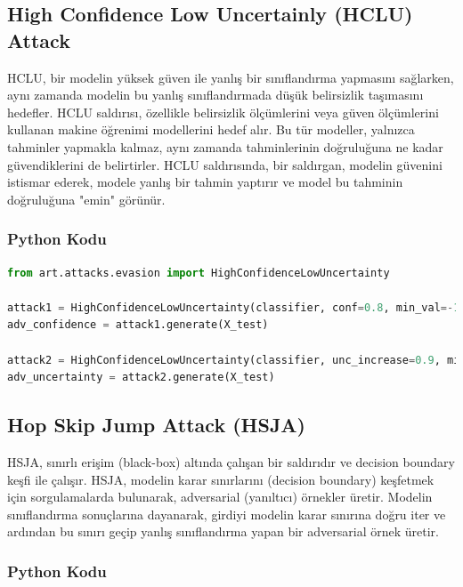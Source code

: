 \newpage

\subsection{High Confidence Low Uncertainly (HCLU) Attack}

HCLU, bir modelin yüksek güven ile yanlış bir sınıflandırma yapmasını sağlarken, aynı zamanda modelin bu yanlış sınıflandırmada düşük belirsizlik taşımasını hedefler. HCLU saldırısı, özellikle belirsizlik ölçümlerini veya güven ölçümlerini kullanan makine öğrenimi modellerini hedef alır. Bu tür modeller, yalnızca tahminler yapmakla kalmaz, aynı zamanda tahminlerinin doğruluğuna ne kadar güvendiklerini de belirtirler. HCLU saldırısında, bir saldırgan, modelin güvenini istismar ederek, modele yanlış bir tahmin yaptırır ve model bu tahminin doğruluğuna "emin" görünür.

\subsubsection{Python Kodu}

\begin{lstlisting}[language=Python]
from art.attacks.evasion import HighConfidenceLowUncertainty

attack1 = HighConfidenceLowUncertainty(classifier, conf=0.8, min_val=-1.0, max_val=2.0)
adv_confidence = attack1.generate(X_test)

attack2 = HighConfidenceLowUncertainty(classifier, unc_increase=0.9, min_val=0.0, max_val=2.0)
adv_uncertainty = attack2.generate(X_test)
\end{lstlisting}

\newpage

\subsection{Hop Skip Jump Attack (HSJA)}

HSJA, sınırlı erişim (black-box) altında çalışan bir saldırıdır ve decision boundary keşfi ile çalışır. HSJA, modelin karar sınırlarını (decision boundary) keşfetmek için sorgulamalarda bulunarak, adversarial (yanıltıcı) örnekler üretir. Modelin sınıflandırma sonuçlarına dayanarak, girdiyi modelin karar sınırına doğru iter ve ardından bu sınırı geçip yanlış sınıflandırma yapan bir adversarial örnek üretir.

\subsubsection{Python Kodu}

